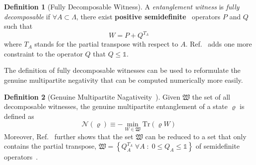 \documentclass[12font]{article}
\numberwithin{equation}{section}    %
\theoremstyle{definition}
\newtheorem{definition}{Definition}[section]
\newcommand{\lr}[1]{\left(  #1  \right)}
\newcommand{\lrg}[1]{\left\{  #1  \right\}}
\newcommand{\mrm}[1]{\mathrm{#1}}
\newcommand{\Tr}{\mrm{Tr}}
\begin{document}
\begin{definition}[Fully Decomposable Witness]
    A \textit{entanglement witness} is \textit{fully decomposable} if $\forall A \subset \Lambda$, there exist \textbf{positive semidefinite}~\cite{Lewenstein-Kraus-Cirac-Horodecki_2000} operators $P$ and $Q$ such that 
    \[
    W = P + Q^{T_A}
    \]
    where $T_A$ stands for the partial transpose with respect to $A$. Ref.~\cite{Lyu-Chandorkar-Kapoor-Takei-Sorensen-Witczak-Krempa_2026} adds one more constraint to the operator $Q$ that $Q \leq \mathds{1}$.
\end{definition}
The definition of fully decomposable witnesses can be used to reformulate the genuine multipartite negativity that can be computed numerically more easily.   
\begin{definition}[Genuine Multipartite Nagativeity~\cite{Jungnitsch-Moroder-Guhne_2011, Hofmann-Moroder-Guhne_2014}]\label{def:GMN_2}
    Given $\mathfrak{W}$ the set of all decomposable witnesses, the genuine multipartite entanglement of a state $\varrho$ is defined as
    \[
    \mathcal{N}(\varrho) \equiv -\min_{W \in \mathfrak{W}}\Tr\lr{\varrho W}
    \]
    Moreover, Ref.~\cite{Lyu-Chandorkar-Kapoor-Takei-Sorensen-Witczak-Krempa_2026} further shows that the set $\mathfrak{W}$ can be reduced to a set that only contains the partial transpose, $\mathfrak{W} = \lrg{Q_A^{T_A} \; \forall A\;:\; 0 \leq Q_A \leq \mathds{1}}$ of semidefinite operators~\cite{Lewenstein-Kraus-Cirac-Horodecki_2000}.
\end{definition}
\end{document}
